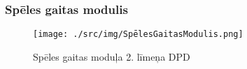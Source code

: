 \clearpage
\subsubsection{Spēles gaitas modulis}

\begin{figure}[htbp]
	\centering
	\texttt{[image: ./src/img/SpēlesGaitasModulis.png]}
	\caption{Spēles gaitas moduļa 2. līmeņa DPD}
	\label{fig:dpd-2-game-progress}
\end{figure}






